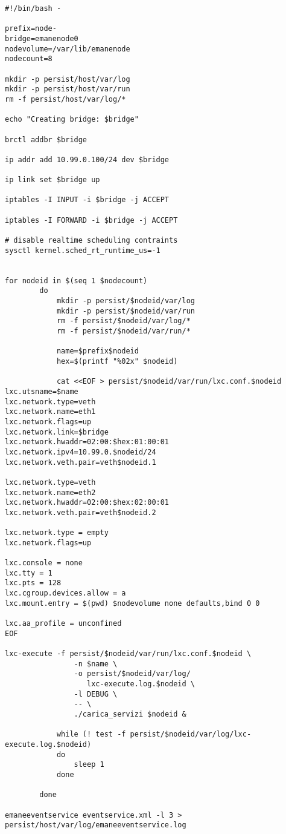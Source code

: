 \lstset{language=BASH}
\begin{lstlisting}
#!/bin/bash -

prefix=node-
bridge=emanenode0
nodevolume=/var/lib/emanenode
nodecount=8

mkdir -p persist/host/var/log
mkdir -p persist/host/var/run
rm -f persist/host/var/log/*

echo "Creating bridge: $bridge"
                
brctl addbr $bridge
                
ip addr add 10.99.0.100/24 dev $bridge
                
ip link set $bridge up
                
iptables -I INPUT -i $bridge -j ACCEPT
                
iptables -I FORWARD -i $bridge -j ACCEPT

# disable realtime scheduling contraints
sysctl kernel.sched_rt_runtime_us=-1


for nodeid in $(seq 1 $nodecount)
        do
            mkdir -p persist/$nodeid/var/log
            mkdir -p persist/$nodeid/var/run
            rm -f persist/$nodeid/var/log/*
            rm -f persist/$nodeid/var/run/*

            name=$prefix$nodeid
            hex=$(printf "%02x" $nodeid)

            cat <<EOF > persist/$nodeid/var/run/lxc.conf.$nodeid
lxc.utsname=$name
lxc.network.type=veth
lxc.network.name=eth1
lxc.network.flags=up
lxc.network.link=$bridge
lxc.network.hwaddr=02:00:$hex:01:00:01
lxc.network.ipv4=10.99.0.$nodeid/24
lxc.network.veth.pair=veth$nodeid.1

lxc.network.type=veth
lxc.network.name=eth2
lxc.network.hwaddr=02:00:$hex:02:00:01
lxc.network.veth.pair=veth$nodeid.2

lxc.network.type = empty
lxc.network.flags=up

lxc.console = none
lxc.tty = 1
lxc.pts = 128
lxc.cgroup.devices.allow = a
lxc.mount.entry = $(pwd) $nodevolume none defaults,bind 0 0

lxc.aa_profile = unconfined
EOF

lxc-execute -f persist/$nodeid/var/run/lxc.conf.$nodeid \
                -n $name \
                -o persist/$nodeid/var/log/
                   lxc-execute.log.$nodeid \
                -l DEBUG \
                -- \
                ./carica_servizi $nodeid &

            while (! test -f persist/$nodeid/var/log/lxc-execute.log.$nodeid)
            do
                sleep 1
            done

        done

emaneeventservice eventservice.xml -l 3 > persist/host/var/log/emaneeventservice.log
\end{lstlisting}

